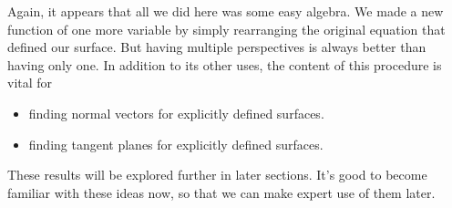 \documentclass{ximera}
\begin{document}
Again, it appears that all we did here was some easy algebra.  We made
a new function of one more variable by simply rearranging the original
equation that defined our surface.  But having multiple perspectives is 
always better than having only one.  In addition to its other uses, the 
content of this procedure is vital for
\begin{itemize}
\item finding normal vectors for explicitly defined surfaces.
\item finding tangent planes for explicitly defined surfaces.
\end{itemize}

These results will be explored further in later sections.  It's good to become 
familiar with these ideas now, so that we can make expert use of them later.


\end{document}
